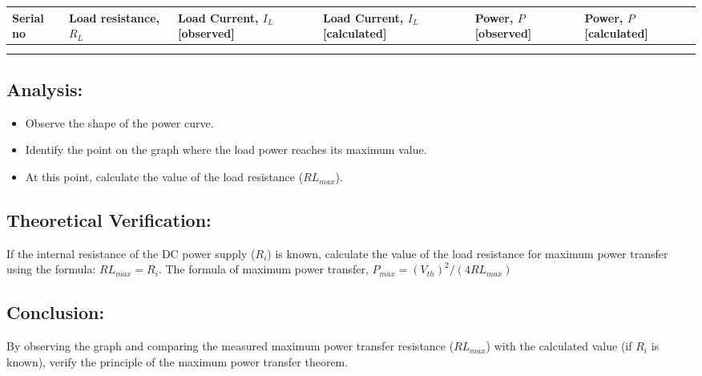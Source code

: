 \begin{table}[H]
    \centering
    \begin{tabular}{m{1cm}|m{2cm}|m{2.5cm}|m{2.5cm}|m{2cm}|m{2cm}}
        \hline
        Serial no & Load resistance, $R_L$ & Load Current, $I_L$ [observed] & Load Current, $I_L$ [calculated] & Power, $P$ [observed] & Power, $P$ [calculated] \\
        \hline
          &   &   &   &  & \\
        \hline
          &   &   &   &  & \\
        \hline

    \end{tabular}
    \label{tab:placeholder_label}
\end{table}

\subsection*{Analysis:}
\begin{itemize}
    \item Observe the shape of the power curve.
    \item Identify the point on the graph where the load power reaches its maximum value.
    \item At this point, calculate the value of the load resistance ($RL_{max}$).
\end{itemize}

\subsection*{Theoretical Verification:}
If the internal resistance of the DC power supply ($R_i$) is known, calculate the value of the load resistance for maximum power transfer using the formula: $RL_{max} = R_i$. The formula of maximum power transfer, $P_{max} = (V_{th})^2 / (4 RL_{max})$

\subsection*{Conclusion:}
By observing the graph and comparing the measured maximum power transfer resistance ($RL_{max}$) with the calculated value (if $R_i$ is known), verify the principle of the maximum power transfer theorem.

\newpage
